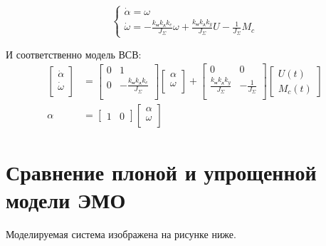 \documentclass[a4paper, 11pt]{article}
\begin{document}
\begin{equation}
    \begin{cases}
    \dot{\alpha} = \omega \\
    \dot{\omega} = -\frac{k_\text{м}k_\text{д}k_e}{J_\Sigma}\omega + \frac{k_\text{м}k_\text{д}k_y}{J_\Sigma}U - \frac{1}{J_\Sigma}M_c
    \end{cases}
\end{equation}

И соответственно модель ВСВ: 
\begin{align}
    \begin{bmatrix}
        \dot{\alpha} \\
        \dot{\omega} \\
    \end{bmatrix} & = 
    \begin{bmatrix}
        0 & 1 \\
        0 & -\frac{k_\text{м}k_\text{д}k_e}{J_\Sigma} \\
    \end{bmatrix}
    \begin{bmatrix}
        \alpha \\
        \omega \\
    \end{bmatrix} + 
    \begin{bmatrix}
        0 & 0 \\
        \frac{k_\text{м}k_\text{д}k_y}{J_\Sigma} & -\frac{1}{J_\Sigma} \\
    \end{bmatrix}
    \begin{bmatrix}
        U(t) \\
        M_c(t)
    \end{bmatrix} \\
    \alpha & = 
    \begin{bmatrix}
        1 & 0 
    \end{bmatrix}
    \begin{bmatrix}
        \alpha \\
        \omega \\
    \end{bmatrix}
\end{align}
\section*{Сравнение плоной и упрощенной модели ЭМО}

Моделируемая система изображена на рисунке ниже.
\end{document}
